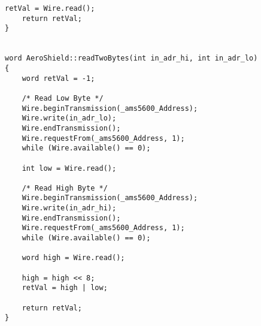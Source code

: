 \begin{lstlisting}[caption={Zdrojový kód súboru AeroShield.cpp.},captionpos=b]
	retVal = Wire.read();                         
	return retVal;                                   
}


word AeroShield::readTwoBytes(int in_adr_hi, int in_adr_lo)     
{
	word retVal = -1;
	
	/* Read Low Byte */
	Wire.beginTransmission(_ams5600_Address);     
	Wire.write(in_adr_lo);                        
	Wire.endTransmission();                        
	Wire.requestFrom(_ams5600_Address, 1);          
	while (Wire.available() == 0);                  
	
	int low = Wire.read();                    
	
	/* Read High Byte */
	Wire.beginTransmission(_ams5600_Address);       
	Wire.write(in_adr_hi);                    
	Wire.endTransmission();                       
	Wire.requestFrom(_ams5600_Address, 1);        
	while (Wire.available() == 0);               
	
	word high = Wire.read();                    
	
	high = high << 8;                             
	retVal = high | low;
	
	return retVal;                                
}	
\end{lstlisting}